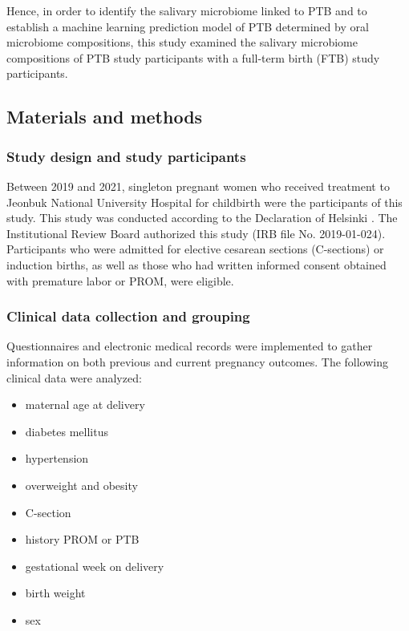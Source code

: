 \documentclass[11pt, a4paper, onecolumn, oneside]{report}
\begin{document}
            Hence, in order to identify the salivary microbiome linked to PTB and to establish a machine learning prediction model of PTB determined by oral microbiome compositions, this study examined the salivary microbiome compositions of PTB study participants with a full-term birth (FTB) study participants.
        \newpage

        \subsection{Materials and methods}
            \subsubsection{Study design and study participants}
                Between 2019 and 2021, singleton pregnant women who received treatment to Jeonbuk National University Hospital for childbirth were the participants of this study. This study was conducted according to the Declaration of Helsinki \cite{Helsinki-1}. The Institutional Review Board authorized this study (IRB file No. 2019-01-024). Participants who were admitted for elective cesarean sections (C-sections) or induction births, as well as those who had written informed consent obtained with premature labor or PROM, were eligible.

            \subsubsection{Clinical data collection and grouping}
                Questionnaires and electronic medical records were implemented to gather information on both previous and current pregnancy outcomes. The following clinical data were analyzed:
                \begin{itemize}[noitemsep, nolistsep]
                    \item maternal age at delivery
                    \item diabetes mellitus
                    \item hypertension
                    \item overweight and obesity
                    \item C-section
                    \item history PROM or PTB
                    \item gestational week on delivery
                    \item birth weight
                    \item sex
                \end{itemize}
\end{document}
